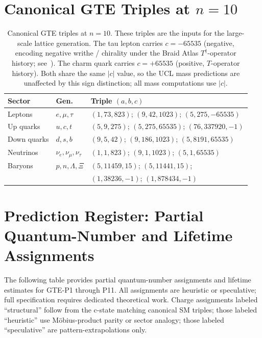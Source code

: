 \documentclass[12pt]{article}
\numberwithin{equation}{section}
\begin{document}
\appendix

\section{Canonical GTE Triples at $n{=}10$}
\label{app:triples}

\begin{table}[H]
\centering
\footnotesize
\setlength{\tabcolsep}{5pt}
\renewcommand{\arraystretch}{1.1}
\begin{tabular}{lll}
\toprule
Sector & Gen. & Triple $(a,b,c)$ \\
\midrule
Leptons & $e,\mu,\tau$ & $(1,73,823)$; $(9,42,1023)$; $(5,275,\mathbf{-}65535)$ \\
Up quarks & $u,c,t$ & $(5,9,275)$; $(5,275,65535)$; $(76,337920,-1)$ \\
Down quarks & $d,s,b$ & $(9,5,42)$; $(9,186,1023)$; $(5,8191,65535)$ \\
Neutrinos & $\nu_e,\nu_\mu,\nu_\tau$ & $(1,1,823)$; $(9,1,1023)$; $(5,1,65535)$ \\
Baryons & $p,n,\Lambda,\Xi$ & $(5,11459,15)$; $(5,11441,15)$; \\
 & & $(1,38236,-1)$; $(1,878434,-1)$ \\
\bottomrule
\end{tabular}
\normalsize
\caption{Canonical GTE triples at $n{=}10$. These triples are the inputs for the large-scale lattice generation.
The tau lepton carries $c = -65535$ (negative, encoding negative writhe / chirality under the Braid Atlas $T^\dagger$-operator history; see~\cite{SpivackBraidAtlas}).
The charm quark carries $c = +65535$ (positive, $T$-operator history).
Both share the same $|c|$ value, so the UCL mass predictions are unaffected by this sign distinction; all mass computations use $|c|$.}
\label{tab:triples}
\end{table}

\section{Prediction Register: Partial Quantum-Number and Lifetime Assignments}
\label{app:predictions}

The following table provides partial quantum-number assignments and lifetime estimates for GTE-P1 through P11. All assignments are heuristic or speculative; full specification requires dedicated theoretical work. Charge assignments labeled ``structural'' follow from the c-state matching canonical SM triples; those labeled ``heuristic'' use Möbius-product parity or sector analogy; those labeled ``speculative'' are pattern-extrapolations only.
\end{document}
